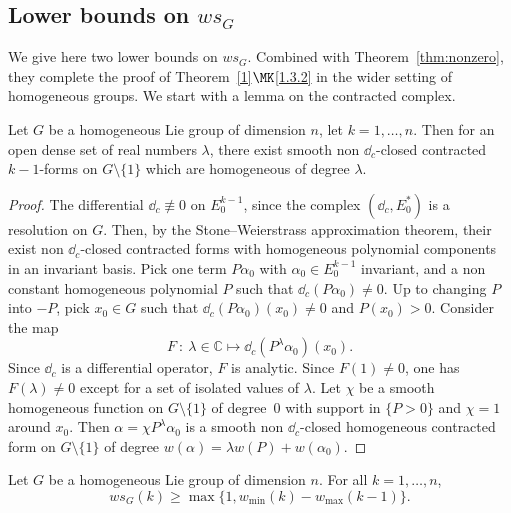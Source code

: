 \subsection{Lower bounds on \texorpdfstring{$ws_G$}{wsG}}

We give here two lower bounds on $ws_G$. Combined with Theorem~\ref{thm:nonzero}, they complete the proof of Theorem~\ref{1}$\MK$\eqref{1.3.2} in the wider setting of homogeneous groups. We start with a lemma on the contracted complex.

\begin{lemm}\label{lem:existence_formes}
Let $G$ be a homogeneous Lie group of dimension $n$, let $k=1,\dots,n$. Then for an open dense set of real numbers $\lambda$, there exist smooth non $\dd_c$-closed contracted $k-1$-forms on $G \setminus \{1\}$ which are homogeneous of degree $\lambda$.
\end{lemm}

\begin{proof}
The differential $\dd_c \not\equiv 0$ on $E_0^{k-1}$, since the complex $(\dd_c, E_0^*)$ is a resolution on $G$. Then, by the Stone--Weierstrass approximation theorem, their exist non $\dd_c$-closed contracted forms with homogeneous polynomial components in an invariant basis. Pick one term $P \alpha_0$ with $\alpha_0\in E_0^{k-1}$ invariant, and a non constant homogeneous polynomial $P$ such that $\dd_c (P\alpha_0)\not=0$. Up to changing $P$ into $-P$, pick $x_0 \in G$ such that $\dd_c(P\alpha_0) (x_0) \not=0$ and $P(x_0) >0$. Consider the map
\[
F \ :\ \lambda \in \mathbb{C} \mapsto \dd_c (P^\lambda \alpha_0) (x_0).
\]
Since $\dd_c$ is a differential operator, $F$ is analytic. Since $F(1) \not=0$, one has $F(\lambda) \not= 0$ except for a set of isolated values of $\lambda$. Let $\chi$ be a smooth homogeneous function on $G \setminus \{1\}$ of degree~$0$ with support in $\{P> 0\}$ and $\chi=1$ around $x_0$. Then $\alpha = \chi P^\lambda \alpha_0$ is a smooth non $\dd_c$-closed homogeneous contracted form on $G\setminus \{1\}$ of degree $w(\alpha)= \lambda w(P) + w(\alpha_0)$.
\end{proof}

\begin{prop}\label{lower}
Let $G$ be a homogeneous Lie group of dimension $n$. For all $k=1,\dots,n$,
\[
ws_G(k)\geq \max\{1, w_{\min}(k)-w_{\max}(k-1)\}.
\]
\end{prop}

